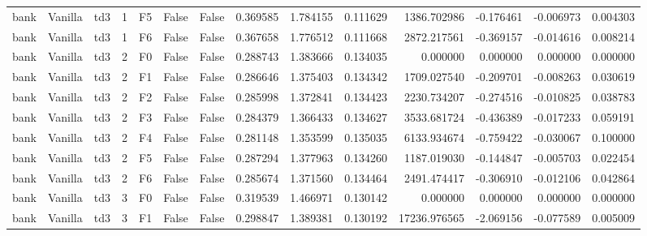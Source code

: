 \begin{tabular}{lllrlllrrrrrrr}
      bank & Vanilla &       td3 &     1 &  F5 &           False &            False &  0.369585 &  1.784155 & 0.111629 &      1386.702986 &          -0.176461 &       -0.006973 &            0.004303 \\
      bank & Vanilla &       td3 &     1 &  F6 &           False &            False &  0.367658 &  1.776512 & 0.111668 &      2872.217561 &          -0.369157 &       -0.014616 &            0.008214 \\
      bank & Vanilla &       td3 &     2 &  F0 &           False &            False &  0.288743 &  1.383666 & 0.134035 &         0.000000 &           0.000000 &        0.000000 &            0.000000 \\
      bank & Vanilla &       td3 &     2 &  F1 &           False &            False &  0.286646 &  1.375403 & 0.134342 &      1709.027540 &          -0.209701 &       -0.008263 &            0.030619 \\
      bank & Vanilla &       td3 &     2 &  F2 &           False &            False &  0.285998 &  1.372841 & 0.134423 &      2230.734207 &          -0.274516 &       -0.010825 &            0.038783 \\
      bank & Vanilla &       td3 &     2 &  F3 &           False &            False &  0.284379 &  1.366433 & 0.134627 &      3533.681724 &          -0.436389 &       -0.017233 &            0.059191 \\
      bank & Vanilla &       td3 &     2 &  F4 &           False &            False &  0.281148 &  1.353599 & 0.135035 &      6133.934674 &          -0.759422 &       -0.030067 &            0.100000 \\
      bank & Vanilla &       td3 &     2 &  F5 &           False &            False &  0.287294 &  1.377963 & 0.134260 &      1187.019030 &          -0.144847 &       -0.005703 &            0.022454 \\
      bank & Vanilla &       td3 &     2 &  F6 &           False &            False &  0.285674 &  1.371560 & 0.134464 &      2491.474417 &          -0.306910 &       -0.012106 &            0.042864 \\
      bank & Vanilla &       td3 &     3 &  F0 &           False &            False &  0.319539 &  1.466971 & 0.130142 &         0.000000 &           0.000000 &        0.000000 &            0.000000 \\
      bank & Vanilla &       td3 &     3 &  F1 &           False &            False &  0.298847 &  1.389381 & 0.130192 &     17236.976565 &          -2.069156 &       -0.077589 &            0.005009 \\

\end{tabular}

